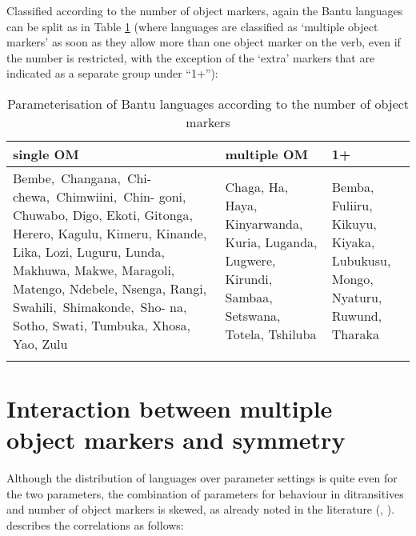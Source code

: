 \documentclass[output=paper
,modfonts
,nonflat]{langsci/langscibook}
\begin{document}
Classified according to the number of object markers, again the Bantu languages can be split as in Table \ref{Table 2} (where languages are classified as ‘multiple object markers’ as soon as they allow more than one object marker on the verb, even if the number is restricted, with the exception of the ‘extra’ markers that are indicated as a separate group under “1+”):

\begin{table}
\caption{Parameterisation of Bantu languages according to the number of object markers}	
\label{Table 2}
\begin{tabularx}{\textwidth}{XXX} 
	\lsptoprule
	single OM & multiple OM & 1+ \\ 
	\midrule 
	\mbox{Bembe, Changana, Chi-} \mbox{chewa, Chimwiini, Chin-} goni, Chuwabo, Digo, Ekoti, Gitonga, Herero, Kagulu, Kimeru, Kinande, Lika, Lozi, Luguru, Lunda, Makhuwa, Makwe, Maragoli, Matengo, Ndebele, Nsenga, Rangi, \mbox{Swahili, Shimakonde, Sho-} na, Sotho, Swati, Tumbuka, Xhosa, Yao, Zulu & Chaga, Ha, Haya, Kinyarwanda, Kuria, Luganda, Lugwere, Kirundi, Sambaa, Setswana, Totela, Tshiluba & Bemba, Fuliiru, Kikuyu, Kiyaka, Lubukusu, Mongo, Nyaturu, Ruwund, Tharaka\\
	\lspbottomrule
\end{tabularx}
\end{table}

\section{Interaction between multiple object markers and symmetry} \label{sec-vdwal:3}

Although the distribution of languages over parameter settings is quite even for the two parameters, the combination of parameters for behaviour in ditransitives and number of object markers is skewed, as already noted in the literature (\citealt[185]{Henderson2006}, \citealt[227]{Zeller_Ngoboka2015}). \citet{Riedel2009} describes the correlations as follows:
\end{document}
